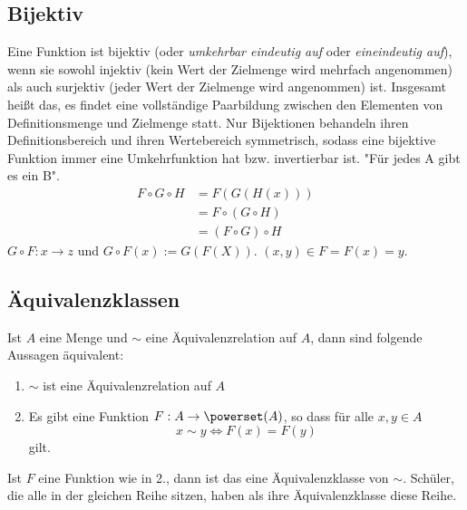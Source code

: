 \subsection{Bijektiv}
Eine Funktion ist bijektiv (oder \emph{umkehrbar eindeutig auf} oder
    \emph{eineindeutig auf}), wenn sie sowohl injektiv (kein Wert der
    Zielmenge wird mehrfach angenommen) als auch surjektiv (jeder Wert der
    Zielmenge wird angenommen) ist. Insgesamt heißt das, es findet eine
    vollständige Paarbildung zwischen den Elementen von Definitionsmenge
    und Zielmenge statt. Nur Bijektionen behandeln ihren Definitionsbereich
    und ihren Wertebereich symmetrisch, sodass eine bijektive Funktion
    immer eine Umkehrfunktion hat bzw. invertierbar ist. "Für jedes A gibt
    es ein B".
\begin{align*}
	F \circ G \circ H &= F(G(H(x))) &&\\
	&= F \circ (G \circ H) &&\\
	&= (F \circ G) \circ H &&
\end{align*}
\(G\circ F: x \rightarrow z\) und \(G \circ F(x):= G(F(X))\).\newline
\((x,y) \in F = F(x)=y\).

\subsection{Äquivalenzklassen}
Ist $A$ eine Menge und $\sim$ eine Äquivalenzrelation auf $A$, dann sind folgende Aussagen äquivalent:
\begin{enumerate}
	\item $\sim$ ist eine Äquivalenzrelation auf $A$
	\item Es gibt eine Funktion $F : A \rightarrow \powerset (A)$, so dass für alle $x, y \in A$ 
	$$x \sim y \Leftrightarrow F(x) = F(y)$$
	gilt.
\end{enumerate}
Ist $F$ eine Funktion wie in 2., dann ist das eine Äquivalenzklasse von $\sim$. Schüler, die alle in der gleichen Reihe sitzen, haben als ihre Äquivalenzklasse diese Reihe.